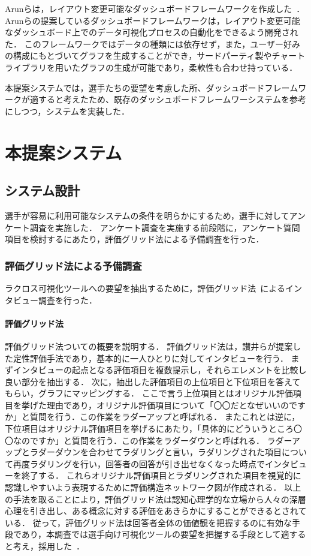 \documentclass[sotsuron]{kuee}
\begin{document}
	Arunらは，レイアウト変更可能なダッシュボードフレームワークを作成した~\cite{dashboard}．
	Arunらの提案しているダッシュボードフレームワークは，レイアウト変更可能なダッシュボード上でのデータ可視化プロセスの自動化をできるよう開発された．
	このフレームワークではデータの種類には依存せず，また，ユーザー好みの構成にもとづいてグラフを生成することができ，サードパーティ製やチャートライブラリを用いたグラフの生成が可能であり，柔軟性も合わせ持っている．
	
	本提案システムでは，選手たちの要望を考慮した所、ダッシュボードフレームワークが適すると考えたため、既存のダッシュボードフレームワーシステムを参考にしつつ，システムを実装した．

\chapter{本提案システム}
	\section{システム設計}
		選手が容易に利用可能なシステムの条件を明らかにするため，選手に対してアンケート調査を実施した．
		アンケート調査を実施する前段階に，アンケート質問項目を検討するにあたり，評価グリッド法による予備調査を行った．
		\subsection{評価グリッド法による予備調査}
			ラクロス可視化ツールへの要望を抽出するために，評価グリッド法~\cite{EGM}によるインタビュー調査を行った．
			\subsubsection{評価グリッド法}
				評価グリッド法ついての概要を説明する．
				評価グリッド法は，讃井らが提案した定性評価手法であり，基本的に一人ひとりに対してインタビューを行う．
				まずインタビューの起点となる評価項目を複数提示し，それらエレメントを比較し良い部分を抽出する．
				次に，抽出した評価項目の上位項目と下位項目を答えてもらい，グラフにマッピングする．
				ここで言う上位項目とはオリジナル評価項目を挙げた理由であり，オリジナル評価項目について「〇〇だとなぜいいのですか」と質問を行う．この作業をラダーアップと呼ばれる．
				またこれとは逆に，下位項目はオリジナル評価項目を挙げるにあたり，「具体的にどういうところ〇〇なのですか」と質問を行う．この作業をラダーダウンと呼ばれる．
				ラダーアップとラダーダウンを合わせてラダリングと言い，ラダリングされた項目について再度ラダリングを行い，回答者の回答が引き出せなくなった時点でインタビューを終了する．
				これらオリジナル評価項目とラダリングされた項目を視覚的に認識しやすいよう表現するために評価構造ネットワーク図が作成される．
				以上の手法を取ることにより，評価グリッド法は認知心理学的な立場から人々の深層心理を引き出し、ある概念に対する評価をあきらかにすることができるとされている．
				従って，評価グリッド法は回答者全体の価値観を把握するのに有効な手段であり，本調査では選手向け可視化ツールの要望を把握する手段として適すると考え，採用した~\cite{EGM}．
\end{document}
